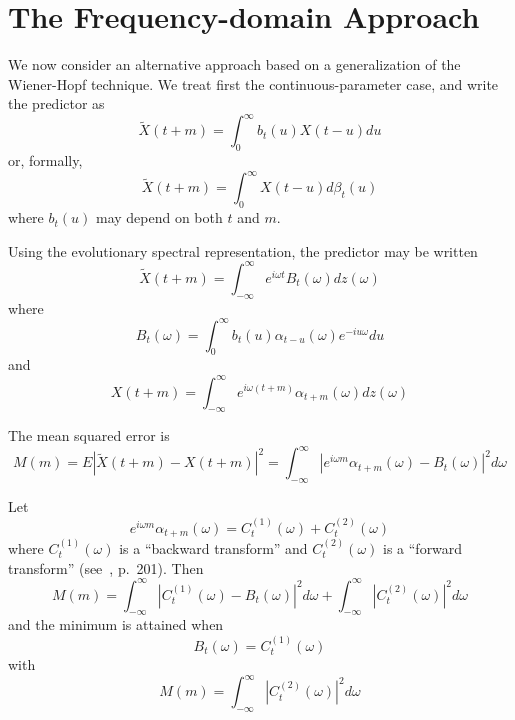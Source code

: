 \documentclass[11pt]{article}
\begin{document}
\section{The Frequency-domain Approach}

We now consider an alternative approach based on a generalization of the Wiener-Hopf technique. We treat first the continuous-parameter case, and write the predictor as
\begin{equation}
\tilde{X}(t+m) = \int_0^{\infty} b_t(u) X(t-u) du
\label{eq:freqpred}
\end{equation}
or, formally,
\begin{equation}
\tilde{X}(t+m) = \int_0^{\infty} X(t-u) d\beta_t(u)
\label{eq:freqpred2}
\end{equation}
where $b_t(u)$ may depend on both $t$ and $m$.

Using the evolutionary spectral representation, the predictor may be written
\begin{equation}
\tilde{X}(t+m) = \int_{-\infty}^{\infty} e^{i\omega t} B_t(\omega) dz(\omega)
\label{eq:freqpredspec}
\end{equation}
where
\begin{equation}
B_t(\omega) = \int_0^{\infty} b_t(u) \alpha_{t-u}(\omega) e^{-iu\omega} du
\label{eq:Bt}
\end{equation}
and
\begin{equation}
X(t+m) = \int_{-\infty}^{\infty} e^{i\omega(t+m)} \alpha_{t+m}(\omega) dz(\omega)
\label{eq:Xtplusmspec}
\end{equation}

The mean squared error is
\begin{equation}
M(m) = E|\tilde{X}(t+m) - X(t+m)|^2 = \int_{-\infty}^{\infty} |e^{i\omega m} \alpha_{t+m}(\omega) - B_t(\omega)|^2 d\omega
\label{eq:freqM}
\end{equation}

Let
\begin{equation}
e^{i\omega m} \alpha_{t+m}(\omega) = C_t^{(1)}(\omega) + C_t^{(2)}(\omega)
\label{eq:Csplit}
\end{equation}
where $C_t^{(1)}(\omega)$ is a ``backward transform'' and $C_t^{(2)}(\omega)$ is a ``forward transform'' (see~\cite{Bartlett1955}, p.~201). Then
\begin{equation}
M(m) = \int_{-\infty}^{\infty} |C_t^{(1)}(\omega) - B_t(\omega)|^2 d\omega + \int_{-\infty}^{\infty} |C_t^{(2)}(\omega)|^2 d\omega
\label{eq:freqMsplit}
\end{equation}
and the minimum is attained when
\begin{equation}
B_t(\omega) = C_t^{(1)}(\omega)
\label{eq:Btopt}
\end{equation}
with
\begin{equation}
M(m) = \int_{-\infty}^{\infty} |C_t^{(2)}(\omega)|^2 d\omega
\label{eq:freqMmin}
\end{equation}
\end{document}
